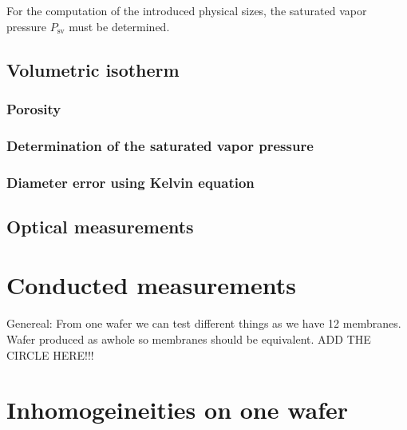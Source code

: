 \documentclass[../thesis.tex]{subfiles}
\begin{document}
        For the computation of the introduced physical sizes, the saturated vapor pressure $P_\mathrm{sv}$ must be determined.



        \subsection{Volumetric isotherm}
        \label{subsec:volumetric-computation}


          \subsubsection{Porosity}
          \label{sssec:porosity}


          \subsubsection{Determination of the saturated vapor pressure}
          \label{sssec:determination-sat-vapor-pressure}



          \subsubsection{Diameter error using Kelvin equation}




        \subsection{Optical measurements}
        \label{subsec:optical-computation}


      \section{Conducted measurements}
      \label{sec:conducted-measurements}

        Genereal: From one wafer we can test different things as we have 12 membranes. Wafer produced as awhole so membranes should be equivalent. ADD THE CIRCLE HERE!!!






      \section{Inhomogeineities on one wafer}
      \label{sec:wafer-inhomogeneities}
\end{document}
